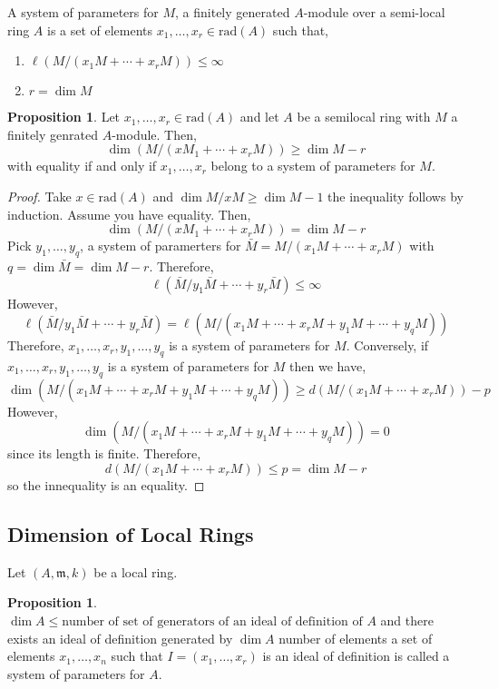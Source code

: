 \documentclass[12pt]{article}
\newcommand{\rad}[1]{\mathrm{rad}\left( #1 \right)}
\newcommand{\m}{\mathfrak{m}}
\theoremstyle{remark}
\theoremstyle{definition}
\newtheorem{proposition}[theorem]{Proposition}
\newenvironment{definition}[1][Definition:]{\begin{trivlist}
\item[\hskip \labelsep {\bfseries #1}]}{\end{trivlist}}
\begin{document}
\begin{definition}
A system of parameters for $M$, a finitely generated $A$-module over a semi-local ring $A$ is a set of elements $x_1, \dots, x_r \in \rad{A}$ such that,
\begin{enumerate}
\item $\ell(M / (x_1 M + \cdots + x_r M)) \le \infty$
\item $r = \dim{M}$
\end{enumerate}

\begin{proposition}
Let $x_1, \dots, x_r \in \rad{A}$ and let $A$ be a semilocal ring with $M$ a finitely genrated $A$-module. Then,
\[ \dim{\left( M / (x M_1 + \cdots + x_r M) \right)} \ge \dim{M} - r \]
with equality if and only if $x_1, \dots, x_r$ belong to a system of parameters for $M$.
\end{proposition}
\end{definition}

\begin{proof}
Take $x \in \rad{A}$ and $\dim{M / xM} \ge \dim{M} - 1$ the inequality follows by induction. Assume you have equality. Then,
\[ \dim{\left( M / (x M_1 + \cdots + x_r M) \right)} = \dim{M} - r \]
Pick $y_1, \dots, y_q$, a system of paramerters for $\bar{M} = M / (x_1 M + \cdots + x_r M)$ with $q = \dim{\bar{M}} = \dim{M} - r$. Therefore,
\[ \ell\left( \bar{M} / y_1 \bar{M} + \cdots + y_r \bar{M} \right) \le \infty \]
However,
\[ \ell\left( \bar{M} / y_1 \bar{M} + \cdots + y_r \bar{M} \right) = \ell\left( M / (x_1 M + \cdots + x_r M + y_1 M + \cdots + y_q M) \right) \]
Therefore, $x_1, \dots, x_r, y_1, \dots, y_q$ is a system of parameters for $M$. Conversely, if  $x_1, \dots, x_r, y_1, \dots, y_q$ is a system of parameters for $M$ then we have,
\[ \dim{\left( M / (x_1 M + \cdots + x_r M + y_1 M + \cdots + y_q M) \right)} \ge d(M / (x_1 M + \cdots + x_r M)) - p \]
However,
\[ \dim{\left( M / (x_1 M + \cdots + x_r M + y_1 M + \cdots + y_q M) \right)} = 0 \]
since its length is finite. Therefore,
\[ d(M / (x_1 M + \cdots + x_r M)) \le p = \dim{M} - r \] 
so the innequality is an equality. 
\end{proof}

\subsection{Dimension of Local Rings}

Let $(A, \m, k)$ be a local ring.

\begin{proposition}
$\dim{A} \le \text{number of set of generators of an ideal of definition of } A$
and there exists an ideal of definition generated by $\dim{A}$ number of elements a set of elements $x_1, \dots, x_n$ such that $I = (x_1, \dots, x_r)$ is an ideal of definition is called a system of parameters for $A$.
\end{proposition}
\end{document}
